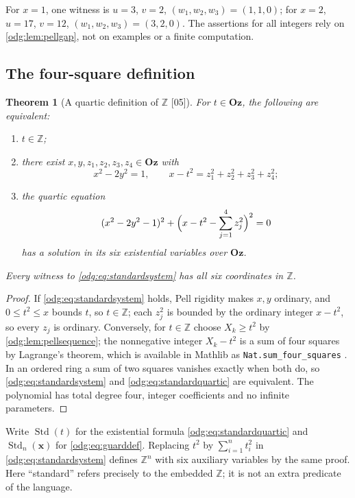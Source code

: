 \documentclass[11pt,oneside]{article}
\numberwithin{equation}{section}
\newtheorem{theorem}{Theorem}[section]
\theoremstyle{definition}
\theoremstyle{remark}
\newcommand{\Oz}{\mathbf{Oz}}
\newcommand{\Z}{\mathbb Z}
\newcommand{\Std}{\operatorname{Std}}
\newcommand{\src}[1]{\textup{\textsf{\small[#1]}}}
\newcommand{\fn}[1]{\nolinkurl{#1}}
\begin{document}
For $x=1$, one witness is $u=3$, $v=2$, $(w_1,w_2,w_3)=(1,1,0)$; for $x=2$,
$u=17$, $v=12$, $(w_1,w_2,w_3)=(3,2,0)$. The assertions for all integers rely
on \cref{odg:lem:pellgap}, not on examples or a finite computation.

\subsection{The four-square definition}

\begin{theorem}[A quartic definition of $\Z$ \src{05}]\label{odg:thm:standarddef}
For $t\in\Oz$, the following are equivalent:
\begin{enumerate}[label=\textup{(\roman*)},leftmargin=*]
\item $t\in\Z$;
\item there exist $x,y,z_1,z_2,z_3,z_4\in\Oz$ with
\begin{equation}\label{odg:eq:standardsystem}
 x^2-2y^2=1,\qquad
 x-t^2=z_1^2+z_2^2+z_3^2+z_4^2;
\end{equation}
\item the quartic equation
\begin{equation}\label{odg:eq:standardquartic}
 (x^2-2y^2-1)^2+
 \Bigl(x-t^2-\sum_{j=1}^{4}z_j^2\Bigr)^2=0
\end{equation}
has a solution in its six existential variables over $\Oz$.
\end{enumerate}
Every witness to \eqref{odg:eq:standardsystem} has all six coordinates in
$\Z$.
\end{theorem}
\begin{proof}
If \eqref{odg:eq:standardsystem} holds, Pell rigidity makes $x,y$ ordinary,
and $0\le t^2\le x$ bounds $t$, so $t\in\Z$; each $z_j^2$ is bounded by the
ordinary integer $x-t^2$, so every $z_j$ is ordinary. Conversely, for
$t\in\Z$ choose $X_k\ge t^2$ by \cref{odg:lem:pellsequence}; the nonnegative
integer $X_k-t^2$ is a sum of four squares by Lagrange's theorem, which is
available in Mathlib as \fn{Nat.sum_four_squares} \cite{FourSquares}.
In an ordered ring a sum of two squares vanishes exactly when both do, so
\eqref{odg:eq:standardsystem} and \eqref{odg:eq:standardquartic} are
equivalent. The polynomial has total degree four, integer coefficients and no
infinite parameters.
\end{proof}

Write $\Std(t)$ for the existential formula \eqref{odg:eq:standardquartic}
and $\Std_n(\mathbf x)$ for \eqref{odg:eq:guarddef}. Replacing $t^2$ by
$\sum_{i=1}^nt_i^2$ in \eqref{odg:eq:standardsystem} defines $\Z^n$ with six
auxiliary variables by the same proof. Here ``standard'' refers precisely to
the embedded $\Z$; it is not an extra predicate of the language.
\end{document}
